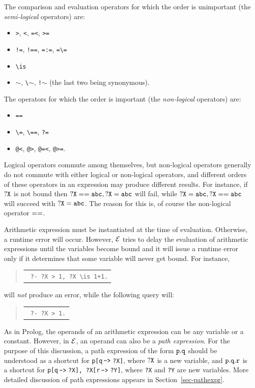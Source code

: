\documentclass[11pt]{article}
\newcommand{\ERGO}{\mbox{\ensuremath{\cal{E}}\smaller{{\sc{RGO}}}}\xspace}
\newcommand{\FLSYSTEM}{\ERGO}
\newenvironment{qrules}{\begin{quote}\tt\begin{tabular}[t]{l}}%
{\end{tabular}\end{quote}}
\newcommand{\mvd}{{\mbox{\tt \,->\,}}}  %
\newcommand{\bs}{\textbackslash}
\begin{document}
The comparison and evaluation operators for which the order is unimportant
(the \emph{semi-logical} operators)  are:
\begin{itemize}
\item  \texttt{>}, \texttt{<}, \texttt{=<}, \texttt{>=}
\item  \texttt{!=}, \texttt{!==}, \texttt{=:=}, \texttt{=\bs=}
\item \texttt{\bs{}is}
\item \texttt{$\sim$}, \texttt{\bs$\sim$}, \texttt{!$\sim$} (the last
  two being synonymous).
\end{itemize}
The operators for which the order is important (the \emph{non-logical}
operators) are:
\begin{itemize}
\item  \texttt{==}
\item  \texttt{\bs=}, \texttt{\bs==}, \texttt{?=}
\item  \texttt{@<}, \texttt{@>}, \texttt{@=<}, \texttt{@>=}.  
\end{itemize}
Logical operators commute among themselves, but non-logical operators
generally do not commute with either logical or non-logical operators, and
different orders of these operators in an expression  may produce different
results. For instance, if $\tt ?X$ is not bound then $\tt ?X == abc, ?X=abc$ will
fail, while  $\tt ?X=abc, ?X == abc$ will succeed with $\tt ?X = abc$.
The reason for this is, of course the non-logical operator $\tt ==$.

Arithmetic expression must be instantiated at the time of
evaluation. Otherwise, a runtime error will occur.
However, \FLSYSTEM tries to delay the evaluation of arithmetic expressions
until the variables become bound and it will issue a runtime error only if
it determines that some variable will never get bound.
For instance,
\begin{qrules}
  \tt
?- ?X > 1, ?X \bs{}is 1+1.
\end{qrules}
will \emph{not}  produce an error, while the following query will:
\begin{qrules}
  \tt
?-  ?X > 1.
\end{qrules}

As in Prolog, the operands of an arithmetic expression can be any variable
or a constant. However, in \FLSYSTEM, an operand can also be a \emph{path
  expression}. For the purpose of this discussion, a path expression of the
form $\tt p.q$ should be understood as a shortcut for {\tt p[q$\mvd$?X]}, where
$\tt ?X$ is a new variable, and $\tt p.q.r$ is a shortcut for {\tt p[q$\mvd$?X],
  ?X[r$\mvd$?Y]}, where \texttt{?X} and \texttt{?Y} are new variables.
More detailed discussion
of path expressions appears in Section~\ref{sec-pathexpr}.
\end{document}
